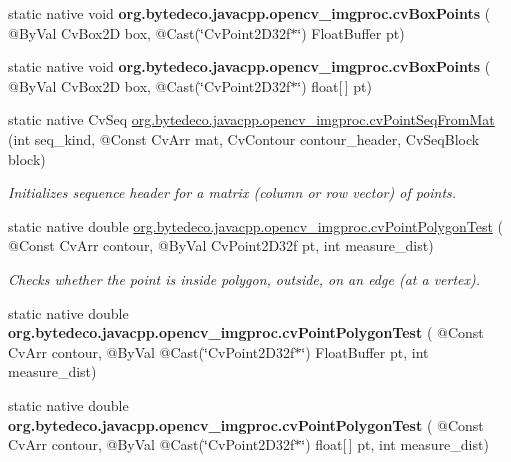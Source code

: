 \begin{DoxyCompactItemize}
\mbox{\label{group__imgproc__c_ga923ce3b064664dde1fc84d9e7972abda}} 
static native void {\bfseries org.\+bytedeco.\+javacpp.\+opencv\+\_\+imgproc.\+cv\+Box\+Points} ( @By\+Val Cv\+Box2D box, @Cast(\char`\"{}Cv\+Point2\+D32f$\ast$\char`\"{}) Float\+Buffer pt)
\item 
\mbox{\label{group__imgproc__c_ga7a9d650500800b7c63e78ddc67ad6b54}} 
static native void {\bfseries org.\+bytedeco.\+javacpp.\+opencv\+\_\+imgproc.\+cv\+Box\+Points} ( @By\+Val Cv\+Box2D box, @Cast(\char`\"{}Cv\+Point2\+D32f$\ast$\char`\"{}) float\mbox{[}$\,$\mbox{]} pt)
\item 
static native Cv\+Seq \hyperlink{group__imgproc__c_ga75ebb68fece47bfb144af0ad2a86668e}{org.\+bytedeco.\+javacpp.\+opencv\+\_\+imgproc.\+cv\+Point\+Seq\+From\+Mat} (int seq\+\_\+kind, @Const Cv\+Arr mat, Cv\+Contour contour\+\_\+header, Cv\+Seq\+Block block)
\begin{DoxyCompactList}\small\item\em Initializes sequence header for a matrix (column or row vector) of points. \end{DoxyCompactList}\item 
static native double \hyperlink{group__imgproc__c_ga9702f652ace9af304514bd89286968b5}{org.\+bytedeco.\+javacpp.\+opencv\+\_\+imgproc.\+cv\+Point\+Polygon\+Test} ( @Const Cv\+Arr contour, @By\+Val Cv\+Point2\+D32f pt, int measure\+\_\+dist)
\begin{DoxyCompactList}\small\item\em Checks whether the point is inside polygon, outside, on an edge (at a vertex). \end{DoxyCompactList}\item 
\mbox{\label{group__imgproc__c_ga76bf0f2db014bb14ede0fe00352dae81}} 
static native double {\bfseries org.\+bytedeco.\+javacpp.\+opencv\+\_\+imgproc.\+cv\+Point\+Polygon\+Test} ( @Const Cv\+Arr contour, @By\+Val @Cast(\char`\"{}Cv\+Point2\+D32f$\ast$\char`\"{}) Float\+Buffer pt, int measure\+\_\+dist)
\item 
\mbox{\label{group__imgproc__c_gaf29359aa5704e498a542f086b90a9736}} 
static native double {\bfseries org.\+bytedeco.\+javacpp.\+opencv\+\_\+imgproc.\+cv\+Point\+Polygon\+Test} ( @Const Cv\+Arr contour, @By\+Val @Cast(\char`\"{}Cv\+Point2\+D32f$\ast$\char`\"{}) float\mbox{[}$\,$\mbox{]} pt, int measure\+\_\+dist)

\end{DoxyCompactItemize}
